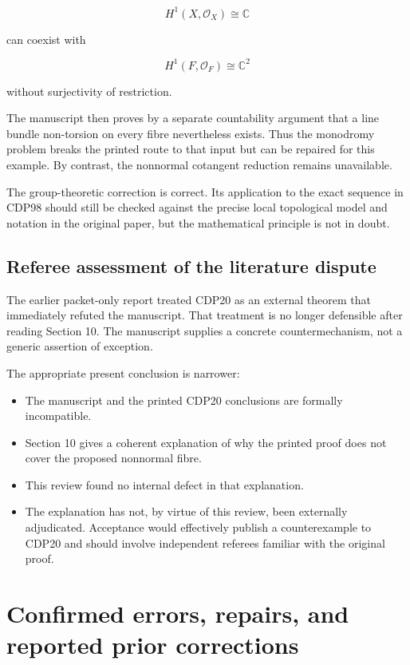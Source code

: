\documentclass[
  10pt,
  letterpaper,
]{article}
\providecommand{\tightlist}{%
  \setlength{\itemsep}{0pt}\setlength{\parskip}{0pt}}
\newcommand{\C}{\mathbb C}
\newcommand{\cO}{\mathcal O}
\begin{document}
\[
H^1(X,\cO_X)\cong\C
\]

can coexist with

\[
H^1(F,\cO_F)\cong\C^2
\]

without surjectivity of restriction.

The manuscript then proves by a separate countability argument that a
line bundle non-torsion on every fibre nevertheless exists. Thus the
monodromy problem breaks the printed route to that input but can be
repaired for this example. By contrast, the nonnormal cotangent
reduction remains unavailable.

The group-theoretic correction is correct. Its application to the exact
sequence in CDP98 should still be checked against the precise local
topological model and notation in the original paper, but the
mathematical principle is not in doubt.

\subsection{Referee assessment of the literature
dispute}\label{referee-assessment-of-the-literature-dispute}

The earlier packet-only report treated CDP20 as an external theorem that
immediately refuted the manuscript. That treatment is no longer
defensible after reading Section 10. The manuscript supplies a concrete
countermechanism, not a generic assertion of exception.

The appropriate present conclusion is narrower:

\begin{itemize}
\tightlist
\item
  The manuscript and the printed CDP20 conclusions are formally
  incompatible.
\item
  Section 10 gives a coherent explanation of why the printed proof does
  not cover the proposed nonnormal fibre.
\item
  This review found no internal defect in that explanation.
\item
  The explanation has not, by virtue of this review, been externally
  adjudicated. Acceptance would effectively publish a counterexample to
  CDP20 and should involve independent referees familiar with the
  original proof.
\end{itemize}

\section{Confirmed errors, repairs, and reported prior
corrections}\label{confirmed-errors-repairs-and-reported-prior-corrections}
\end{document}
